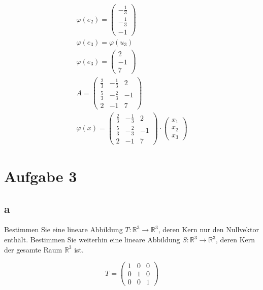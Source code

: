 \begin{align*}
    \varphi(e_2) = \begin{pmatrix}
        -\frac{1}{3} \\ -\frac{1}{3} \\ -1
    \end{pmatrix}\\
    \varphi(e_3) = \varphi(u_3) \\
    \varphi(e_3) = \begin{pmatrix}
        2 \\ -1 \\ 7
    \end{pmatrix} \\
    A = \begin{pmatrix}
        \frac{2}{3} & -\frac{1}{3} & 2 \\
        \frac{5}{3} & -\frac{2}{3} & -1 \\
        2 & -1 & 7
    \end{pmatrix}\\
    \varphi(x) = \begin{pmatrix}
        \frac{2}{3} & -\frac{1}{3} & 2 \\
        \frac{5}{3} & -\frac{2}{3} & -1 \\
        2 & -1 & 7
    \end{pmatrix} \cdot \begin{pmatrix}
        x_1 \\ x_2 \\ x_3
    \end{pmatrix}
\end{align*}

\section{Aufgabe 3}

\subsection{a}
Bestimmen Sie eine lineare Abbildung $T: \mathbb{R}^3 \rightarrow \mathbb{R}^3$, deren Kern nur den Nullvektor enthält. Bestimmen Sie weiterhin eine lineare Abbildung $S: \mathbb{R}^3 \rightarrow \mathbb{R}^3$, deren Kern der gesamte Raum $\mathbb{R}^3$ ist.

\[
T = \begin{pmatrix}
    1 & 0 & 0 \\
    0 & 1 & 0 \\
    0 & 0 & 1
\end{pmatrix}
\]

